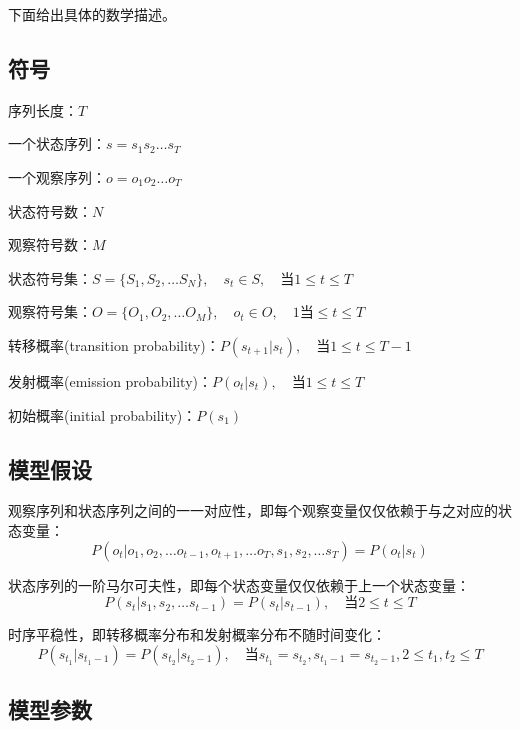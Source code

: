 \documentclass[11pt,a4paper]{article}
\numberwithin{equation}{section}
\begin{document}
下面给出具体的数学描述。

\subsection{符号}

序列长度：$ T $

一个状态序列：$ s = s_1 s_2 \ldots s_T $

一个观察序列：$ o = o_1 o_2 \ldots o_T $

状态符号数：$ N $

观察符号数：$ M $

状态符号集：$ S = \{S_1, S_2, \ldots S_N\}, \quad s_t \in S, \quad \text{当} 1 \le t \le T $

观察符号集：$ O = \{O_1, O_2, \ldots O_M\}, \quad o_t \in O, \quad 1 \text{当} \le t \le T $

转移概率(transition probability)：$ P(s_{t + 1} | s_t), \quad \text{当} 1 \le t \le T - 1 $

发射概率(emission probability)：$ P(o_t | s_t), \quad \text{当} 1 \le t \le T $

初始概率(initial probability)：$ P(s_1) $

\subsection{模型假设}

观察序列和状态序列之间的一一对应性，即每个观察变量仅仅依赖于与之对应的状态变量：
\begin{equation}
P(o_t | o_1, o_2, \ldots o_{t - 1}, o_{t + 1}, \ldots o_T, s_1, s_2, \ldots s_T) = P(o_t | s_t)
\end{equation}

状态序列的一阶马尔可夫性，即每个状态变量仅仅依赖于上一个状态变量：
\begin{equation}
P(s_t | s_1, s_2, \ldots s_{t - 1}) = P(s_t | s_{t - 1}), \quad \text{当} 2 \le t \le T 
\end{equation}

时序平稳性，即转移概率分布和发射概率分布不随时间变化：
\begin{equation}
P(s_{t_1} | s_{t_1 - 1}) = P(s_{t_2} | s_{t_2 - 1}), \quad \text{当} s_{t_1} = s_{t_2}, s_{t_1 - 1} = s_{t_2 - 1}, 2 \le t_1, t_2 \le T 
\end{equation}

\subsection{模型参数}
\end{document}
